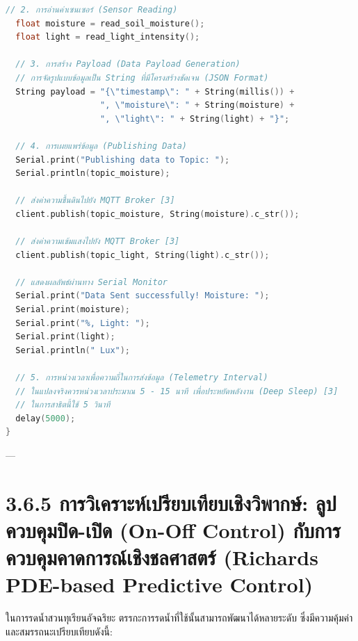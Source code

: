 \documentclass[11pt,a4paper,openany]{report}
\begin{document}
\begin{lstlisting}[language=C++]
  // 2. การอ่านค่าเซนเซอร์ (Sensor Reading)
  float moisture = read_soil_moisture();
  float light = read_light_intensity();
  
  // 3. การสร้าง Payload (Data Payload Generation)
  // การจัดรูปแบบข้อมูลเป็น String ที่มีโครงสร้างชัดเจน (JSON Format)
  String payload = "{\"timestamp\": " + String(millis()) + 
                   ", \"moisture\": " + String(moisture) + 
                   ", \"light\": " + String(light) + "}";

  // 4. การเผยแพร่ข้อมูล (Publishing Data)
  Serial.print("Publishing data to Topic: ");
  Serial.println(topic_moisture);
  
  // ส่งค่าความชื้นดินไปยัง MQTT Broker [3]
  client.publish(topic_moisture, String(moisture).c_str());
  
  // ส่งค่าความเข้มแสงไปยัง MQTT Broker [3]
  client.publish(topic_light, String(light).c_str());
  
  // แสดงผลลัพธ์ผ่านทาง Serial Monitor
  Serial.print("Data Sent successfully! Moisture: ");
  Serial.print(moisture);
  Serial.print("%, Light: ");
  Serial.print(light);
  Serial.println(" Lux");
  
  // 5. การหน่วงเวลาเพื่อความถี่ในการส่งข้อมูล (Telemetry Interval)
  // ในแปลงจริงควรหน่วงเวลาประมาณ 5 - 15 นาที เพื่อประหยัดพลังงาน (Deep Sleep) [3]
  // ในการสาธิตนี้ใช้ 5 วินาที
  delay(5000); 
}
\end{lstlisting}


---

\section{3.6.5 การวิเคราะห์เปรียบเทียบเชิงวิพากษ์: ลูปควบคุมปิด-เปิด (On-Off Control) กับการควบคุมคาดการณ์เชิงชลศาสตร์ (Richards PDE-based Predictive Control)}


ในการรดน้ำสวนทุเรียนอัจฉริยะ ตรรกะการรดน้ำที่ใช้นั้นสามารถพัฒนาได้หลายระดับ ซึ่งมีความคุ้มค่าและสมรรถนะเปรียบเทียบดังนี้:
\end{document}
